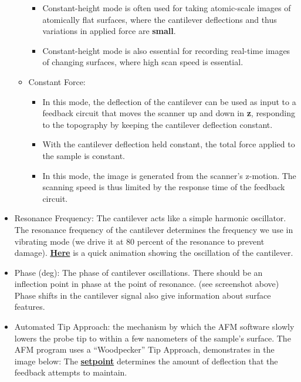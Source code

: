 \documentclass{../lab}
\begin{document}
\begin{itemize}
\begin{itemize}
\begin{itemize}
            \item Constant-height mode is often used for taking atomic-scale images of atomically flat surfaces, where the cantilever deflections and thus variations in applied force are \textbf{small}.

            \item Constant-height mode is also essential for recording real-time images of changing surfaces, where high scan speed is essential.

        \end{itemize}

        \item Constant Force:

        \begin{itemize}
            \item In this mode, the deflection of the cantilever can be used as input to a feedback circuit that moves the scanner up and down in \textbf{z}, responding to the topography by keeping the cantilever deflection constant.

            \item With the cantilever deflection held constant, the total force applied to the sample is constant.

            \item In this mode, the image is generated from the scanner's z-motion. The scanning speed is thus limited by the response time of the feedback circuit.

        \end{itemize}

    \end{itemize}

    \item Resonance Frequency: The cantilever acts like a simple harmonic oscillator. The resonance frequency of the cantilever determines the frequency we use in vibrating mode (we drive it at 80 percent of the resonance to prevent damage). \href{http://experimentationlab.berkeley.edu/sites/default/files/AFMImages/2.1.1.\%20Intro\%20Vibrating\%20Cantf.swf.mp4}{\textbf{Here}} is a quick animation showing the oscillation of the cantilever.

    \item Phase (deg): The phase of cantilever oscillations.  There should be an inflection point in phase at the point of resonance. (see screenshot above) Phase shifts in the cantilever signal also give information about surface features.

    \item Automated Tip Approach:  the mechanism by which the AFM software slowly lowers the probe tip to within a few nanometers of the sample's surface.  The AFM program uses a ``Woodpecker'' Tip Approach, demonstrates in the image below: The \href{http://experimentationlab.berkeley.edu/sites/default/files/AFMImages/VM\%203.3.\%20Avg\%20Dist\%20Control\_converted.mp4}{\textbf{setpoint}} determines the amount of deflection that the feedback attempts to maintain.
    

\end{itemize}
\end{document}
